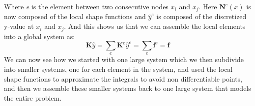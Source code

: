 Where \textit{e} is the element between two consecutive nodes $x_i$ and $x_j$. Here $\mathbf{N}^e(x)$ is now composed of the local shape functions and $\hat{y}^e$ is composed of the discretized y-value at $x_i$ and $x_j$. And this shows us that we can assemble the local elements into a global system as:
\begin{equation*}
	\mathbf{K}\hat{y} = \sum_e \mathbf{K}^e\hat{y}^e = \sum_e \mathbf{f}^e = \mathbf{f}
\end{equation*}
We can now see how we started with one large system which we then subdivide into smaller systems, one for each element in the system, and used the local shape functions to approximate the integrals to avoid non differentiable points, and then we assemble these smaller systems back to one large system that models the entire problem.